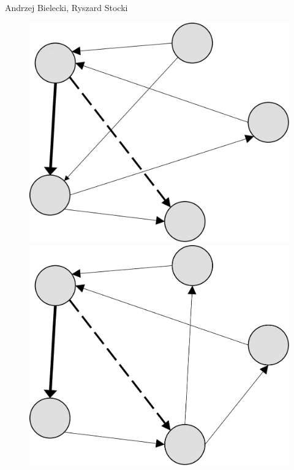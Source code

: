\begin{artengenv2auth}{Andrzej Bielecki, Ryszard Stocki}
\begin{figure}[htbp]
 \begin{minipage}[b]{.45\textwidth}
   \centering
   \includegraphics[width=\textwidth]{ART_Bielecki/Figure_3_a_pu.png}
 \end{minipage}%
 \hfill
 \begin{minipage}[b]{.45\textwidth}
   \centering
   \includegraphics[width=\textwidth]{ART_Bielecki/Figure_3_b_pu.png}
 \end{minipage}


\end{figure}
\end{artengenv2auth}
